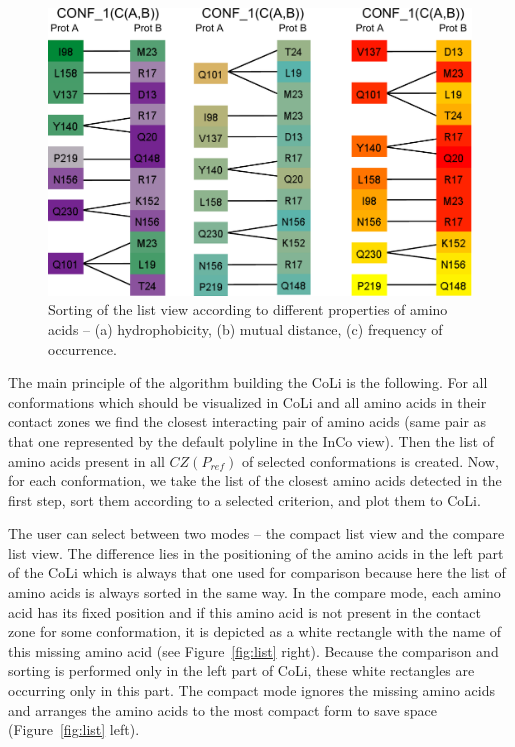 \documentclass[journal]{vgtc}                %
\begin{document}
\begin{figure}[bt]
  \centering
  \includegraphics[width=1.0\columnwidth]{sorting.pdf}
  \caption{Sorting of the list view according to different properties of amino acids -- (a) hydrophobicity, (b) mutual distance, (c) frequency of occurrence.}
  \label{fig:sorting}
\end{figure}

The main principle of the algorithm building the CoLi is the following.
For all conformations which should be visualized in CoLi and all amino acids in their contact zones we find the closest interacting pair of amino acids (same pair as that one represented by the default polyline in the InCo view).
Then the list of amino acids present in all $CZ(P_{ref})$ of selected conformations is created.
Now, for each conformation, we take the list of the closest amino acids detected in the first step, sort them according to a selected criterion, and plot them to CoLi.

The user can select between two modes -- the compact list view and the compare list view.
The difference lies in the positioning of the amino acids in the left part of the CoLi which is always that one used for comparison because here the list of amino acids is always sorted in the same way. 
In the compare mode, each amino acid has its fixed position and if this amino acid is not present in the contact zone for some conformation, it is depicted as a white rectangle with the name of this missing amino acid (see Figure~\ref{fig:list} right).
Because the comparison and sorting is performed only in the left part of CoLi, these white rectangles are occurring only in this part.
The compact mode ignores the missing amino acids and arranges the amino acids to the most compact form to save space (Figure~\ref{fig:list} left).
\end{document}
